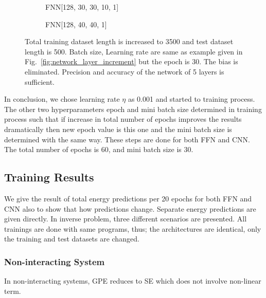 \documentclass[a4paper,times,12pt]{article}
\begin{document}
\begin{figure}[H]
    \centering
    \begin{subfigure}[t]{0.45\textwidth}
		\centering
        
        \caption{FNN[128, 30, 30, 10, 1]}
		\label{fig:a}
    \end{subfigure}
    \begin{subfigure}[t]{0.45\textwidth}
        \centering
        
        \caption{FNN[128, 40, 40, 1]}
		\label{fig:b}
    \end{subfigure}
    \caption{Total training dataset length is increased to 3500 and test dataset length is 500. Batch size, Learning rate are same as example given in Fig.~\ref{fig:network_layer_increment} but the epoch is 30. The bias is eliminated. Precision and accuracy of the network of 5 layers is sufficient.}
\end{figure}

In conclusion, we chose learning rate $\eta$ as 0.001 and started to training process. The other two hyperparameters epoch and mini batch size determined in training process such that if increase in total number of epochs improves the results dramatically then new epoch value is this one and the mini batch size is determined with the same way. These steps are done for both FFN and CNN. The total number of epochs is 60, and mini batch size is 30. 


\subsection{Training Results}

We give the result of total energy predictions per 20 epochs for both FFN and CNN also to show that how predictions change. Separate energy predictions are given directly. In inverse problem, three different scenarios are presented. All trainings are done with same programs, thus; the architectures are identical, only the training and test datasets are changed. 

\subsubsection{Non-interacting System}

In non-interacting systems, GPE reduces to SE which does not involve non-linear term. 
\end{document}
